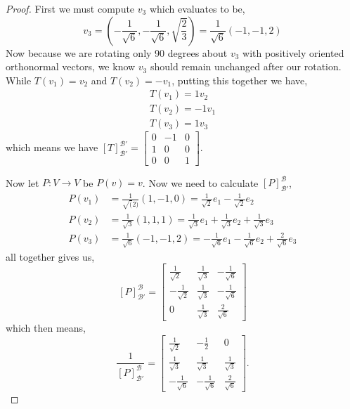 \documentclass[11pt]{article}
\begin{document}
\begin{proof}
  First we must compute $v_3$ which evaluates to be,
  \[v_3 = (-\frac{1}{\sqrt{6}}, -\frac{1}{\sqrt{6}}, \sqrt{\frac{2}{3}}) = \frac{1}{\sqrt{6}}(-1,-1,2)\]
  Now because we are rotating only 90 degrees about $v_3$ with positively oriented orthonormal vectors, we know $v_3$ should remain unchanged after our rotation. While $T(v_1) = v_2$ and $T(v_2) = -v_1$, putting this together we have,
  \begin{align*}
    T(v_1) = 1v_2 \\
    T(v_2) = -1v_1 \\
    T(v_3) = 1v_3
  \end{align*}
  which means we have $[T]_{\mathcal{B}'}^{\mathcal{B}'} = \begin{bmatrix}
    0 & -1 & 0 \\
    1 & 0 & 0 \\
    0 & 0 & 1
  \end{bmatrix}$.

  Now let $P:V \to V$ be $P(v) = v$. Now we need to calculate $[P]_{\mathcal{B}'}^{\mathcal{B}}$, 
  \begin{align*}
    P(v_1) &= \frac{1}{\sqrt(2)}(1,-1,0) = \frac{1}{\sqrt{2}}e_1 -\frac{1}{\sqrt{2}}e_2  \\
    P(v_2) &= \frac{1}{\sqrt{3}}(1,1,1) = \frac{1}{\sqrt{3}}e_1 + \frac{1}{\sqrt{3}}e_2 + \frac{1}{\sqrt{3}}e_3 \\
    P(v_3) &= \frac{1}{\sqrt{6}}(-1,-1,2) = -\frac{1}{\sqrt{6}}e_1 -\frac{1}{\sqrt{6}}e_2 + \frac{2}{\sqrt{6}}e_3 
  \end{align*}
  all together gives us,
  \[[P]_{\mathcal{B}'}^{\mathcal{B}} = \begin{bmatrix}
    \frac{1}{\sqrt{2}} & \frac{1}{\sqrt{3}} & -\frac{1}{\sqrt{6}} \\
    - \frac{1}{\sqrt{2}} & \frac{1}{\sqrt{3}} & -\frac{1}{\sqrt{6}} \\
    0 & \frac{1}{\sqrt{3}} & \frac{2}{\sqrt{6}}
  \end{bmatrix}\]
  which then means,
  \[\frac{1}{[P]_{\mathcal{B}'}^{\mathcal{B}}}= \begin{bmatrix}
    \frac{1}{\sqrt{2}} & -\frac{1}{2} & 0 \\
    \frac{1}{\sqrt{3}} & \frac{1}{\sqrt{3}} & \frac{1}{\sqrt{3}} \\
    -\frac{1}{\sqrt{6}} & -\frac{1}{\sqrt{6}} & \frac{2}{\sqrt{6}}
  \end{bmatrix}.\]


\end{proof}
\end{document}
